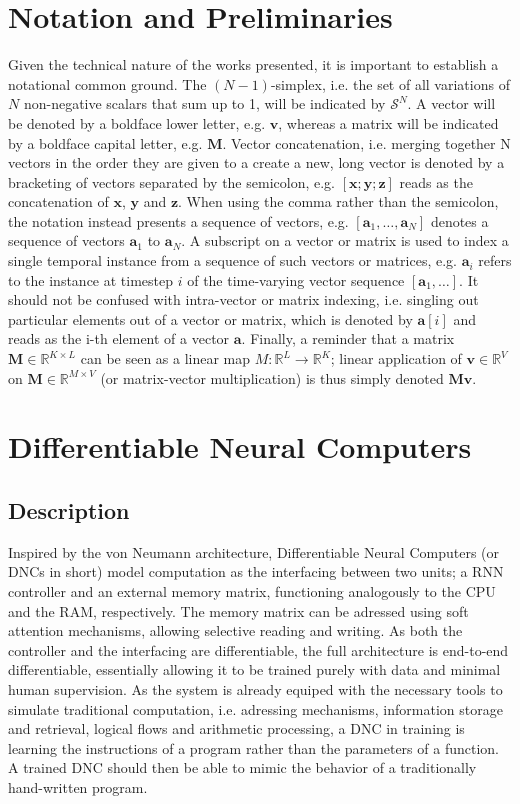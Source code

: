 \documentclass[]{article}
\begin{document}
\section{Notation and Preliminaries}
\label{sec:Notation}
Given the technical nature of the works presented, it is important to establish a notational common ground. The $(N-1)$-simplex, i.e. the set of all variations of $N$ non-negative scalars that sum up to 1, will be indicated by $\mathcal{S}^N$. A vector will be denoted by a boldface lower letter, e.g. $\pmb{v}$, whereas a matrix will be indicated by a boldface capital letter, e.g. $\pmb M$. Vector concatenation, i.e. merging together N vectors in the order they are given to a create a new, long vector is denoted by a bracketing of vectors separated by the semicolon, e.g. $[\pmb{x}; \pmb{y}; \pmb{z}]$ reads as the concatenation of $\pmb x$, $\pmb y$ and $\pmb z$. When using the comma rather than the semicolon, the notation instead presents a sequence of vectors, e.g. $[\pmb a _1, \dots ,\pmb a _N]$ denotes a sequence of vectors $\pmb a _1$ to $\pmb a _N$. A subscript on a vector or matrix is used to index a single temporal instance from a sequence of such vectors or matrices, e.g. $\pmb{a}_i$ refers to the instance at timestep $i$ of the time-varying vector sequence $[\pmb a _1 , \dots ]$. It should not be confused with intra-vector or matrix indexing, i.e. singling out particular elements out of a vector or matrix, which is denoted by $\pmb a [i]$ and reads as the i-th element of a vector $\pmb a$. Finally, a reminder that a matrix $\pmb M \in \mathbb{R}^{K\times L}$ can be seen as a linear map $M: \mathbb{R}^L \to \mathbb{R}^K$; linear application of $\pmb v \in \mathbb{R}^V $ on $\pmb M \in \mathbb{R}^{M \times V}$ (or matrix-vector multiplication) is thus simply denoted $\pmb {Mv}$.


\section{Differentiable Neural Computers}
\label{DNC}
\subsection{Description}
Inspired by the von Neumann architecture, Differentiable Neural Computers (or DNCs in short) model computation as the interfacing between two units; a RNN controller and an external memory matrix, functioning analogously to the CPU and the RAM, respectively. The memory matrix can be adressed using soft attention mechanisms, allowing selective reading and writing. As both the controller and the interfacing are differentiable, the full architecture is end-to-end differentiable, essentially allowing it to be trained purely with data and minimal human supervision. As the system is already equiped with the necessary tools to simulate traditional computation, i.e. adressing mechanisms, information storage and retrieval, logical flows and arithmetic processing, a DNC in training is learning the instructions of a program rather than the parameters of a function. A trained DNC should then be able to mimic the behavior of a traditionally hand-written program.
\end{document}
